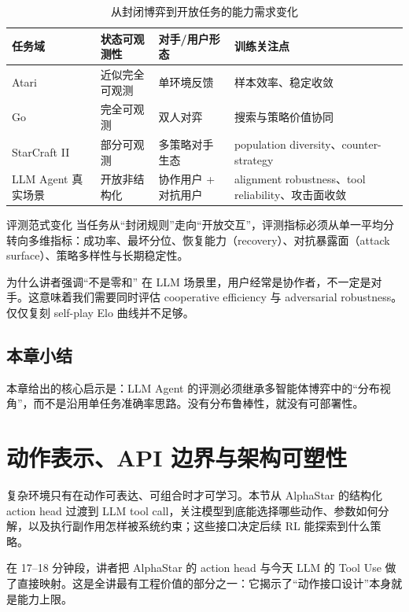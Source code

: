 \documentclass[a4paper]{article}
\begin{document}
\begin{table}[H]
\centering
\caption{从封闭博弈到开放任务的能力需求变化}
\begin{tabular}{p{2.3cm}p{2.9cm}p{2.9cm}p{5.4cm}}
\toprule
任务域 & 状态可观测性 & 对手/用户形态 & 训练关注点 \\
\midrule
Atari & 近似完全可观测 & 单环境反馈 & 样本效率、稳定收敛 \\
Go & 完全可观测 & 双人对弈 & 搜索与策略价值协同 \\
StarCraft II & 部分可观测 & 多策略对手生态 & population diversity、counter-strategy \\
LLM Agent 真实场景 & 开放非结构化 & 协作用户 + 对抗用户 & alignment robustness、tool reliability、攻击面收敛 \\
\bottomrule
\end{tabular}
\end{table}

\begin{importantbox}{评测范式变化}
当任务从``封闭规则''走向``开放交互''，评测指标必须从单一平均分转向多维指标：成功率、最坏分位、恢复能力（recovery）、对抗暴露面（attack surface）、策略多样性与长期稳定性。
\end{importantbox}

\begin{knowledgebox}{为什么讲者强调``不是零和''}
在 LLM 场景里，用户经常是协作者，不一定是对手。这意味着我们需要同时评估 cooperative efficiency 与 adversarial robustness。仅仅复刻 self-play Elo 曲线并不足够。
\end{knowledgebox}

\subsection{本章小结}
本章给出的核心启示是：LLM Agent 的评测必须继承多智能体博弈中的``分布视角''，而不是沿用单任务准确率思路。没有分布鲁棒性，就没有可部署性。

\section{动作表示、API 边界与架构可塑性}

复杂环境只有在动作可表达、可组合时才可学习。本节从 AlphaStar 的结构化 action head 过渡到 LLM tool call，关注模型到底能选择哪些动作、参数如何分解，以及执行副作用怎样被系统约束；这些接口决定后续 RL 能探索到什么策略。

在 17--18 分钟段，讲者把 AlphaStar 的 action head 与今天 LLM 的 Tool Use 做了直接映射。这是全讲最有工程价值的部分之一：它揭示了``动作接口设计''本身就是能力上限。
\end{document}
